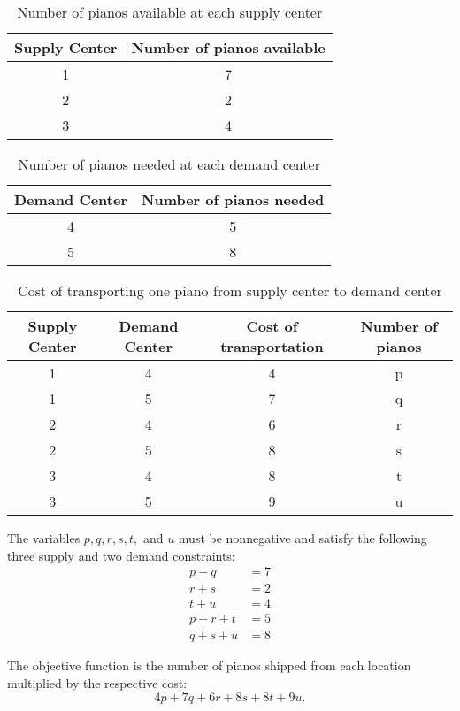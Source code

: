 \begin{table}[h]
\centering
\begin{tabular}{|c|c|}
Supply Center & Number of pianos available\\
\hline
1 & 7\\
2 & 2\\
3 & 4\\
\end{tabular}

\caption{Number of pianos available at each supply center}
\label{tab:supply}
\end{table}

\begin{table}[h]
\centering
\begin{tabular}{|c|c|}
Demand Center & Number of pianos needed\\
\hline
4 & 5\\
5 & 8\\
\end{tabular}

\caption{Number of pianos needed at each demand center}
\label{tab:demand}
\end{table}

\begin{table}[h]
\centering
\begin{tabular}{|c|c|c|c|}
Supply Center & Demand Center & Cost of transportation & Number of pianos\\
\hline
1 & 4 & 4 & p\\
1 & 5 & 7 & q\\
2 & 4 & 6 & r\\
2 & 5 & 8 & s\\
3 & 4 & 8 & t\\
3 & 5 & 9 & u\\
\end{tabular}
\caption{Cost of transporting one piano from supply center to demand center}
\label{tab:cost}
\end{table}

The variables $p,q,r,s,t,$ and $u$ must be nonnegative and satisfy the following three supply and two demand constraints:
\begin{align*}
p + q  &= 7\\
r + s  &= 2\\
t + u  &= 4\\
p + r + t &= 5\\
q + s + u &= 8
\end{align*}

The objective function is the number of pianos shipped from each location multiplied by the respective cost:
\[
4p + 7q + 6r + 8s + 8t + 9u.
\]

